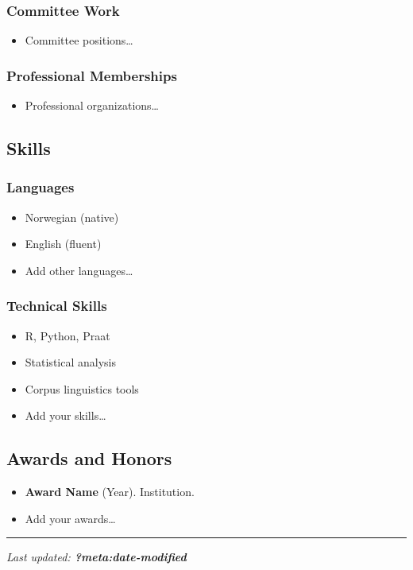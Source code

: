 \documentclass[
]{article}
\providecommand{\tightlist}{%
  \setlength{\itemsep}{0pt}\setlength{\parskip}{0pt}}\usepackage{longtable,booktabs,array}
\begin{document}
\subsubsection{Committee Work}\label{committee-work}

\begin{itemize}
\tightlist
\item
  Committee positions\ldots{}
\end{itemize}

\subsubsection{Professional Memberships}\label{professional-memberships}

\begin{itemize}
\tightlist
\item
  Professional organizations\ldots{}
\end{itemize}

\subsection{Skills}\label{skills}

\subsubsection{Languages}\label{languages}

\begin{itemize}
\tightlist
\item
  Norwegian (native)
\item
  English (fluent)
\item
  Add other languages\ldots{}
\end{itemize}

\subsubsection{Technical Skills}\label{technical-skills}

\begin{itemize}
\tightlist
\item
  R, Python, Praat
\item
  Statistical analysis
\item
  Corpus linguistics tools
\item
  Add your skills\ldots{}
\end{itemize}

\subsection{Awards and Honors}\label{awards-and-honors}

\begin{itemize}
\tightlist
\item
  \textbf{Award Name} (Year). Institution.
\item
  Add your awards\ldots{}
\end{itemize}

\begin{center}\rule{0.5\linewidth}{0.5pt}\end{center}

\emph{Last updated: \textbf{?meta:date-modified}}
\end{document}
